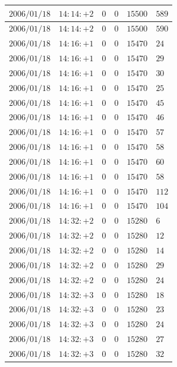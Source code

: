 \documentclass[a4j,papersize,disablejfam,slide,14pt]{jsarticle}
\begin{document}
\begin{description}
\begin{center}
\begin{longtable}{|l|l|l|l|l|l|}
					$2006/01/18$ & $14:14:+2$  & $0$ & $0$ & $15500$ & $589$ \\ \hline
					$2006/01/18$ & $14:14:+2$  & $0$ & $0$ & $15500$ & $590$ \\ \hline
					$2006/01/18$ & $14:16:+1$  & $0$ & $0$ & $15470$ & $24$ \\ \hline
					$2006/01/18$ & $14:16:+1$  & $0$ & $0$ & $15470$ & $29$ \\ \hline
					$2006/01/18$ & $14:16:+1$  & $0$ & $0$ & $15470$ & $30$ \\ \hline
					$2006/01/18$ & $14:16:+1$  & $0$ & $0$ & $15470$ & $25$ \\ \hline
					$2006/01/18$ & $14:16:+1$  & $0$ & $0$ & $15470$ & $45$ \\ \hline
					$2006/01/18$ & $14:16:+1$  & $0$ & $0$ & $15470$ & $46$ \\ \hline
					$2006/01/18$ & $14:16:+1$  & $0$ & $0$ & $15470$ & $57$ \\ \hline
					$2006/01/18$ & $14:16:+1$  & $0$ & $0$ & $15470$ & $58$ \\ \hline
					$2006/01/18$ & $14:16:+1$  & $0$ & $0$ & $15470$ & $60$ \\ \hline
					$2006/01/18$ & $14:16:+1$  & $0$ & $0$ & $15470$ & $58$ \\ \hline
					$2006/01/18$ & $14:16:+1$  & $0$ & $0$ & $15470$ & $112$ \\ \hline
					$2006/01/18$ & $14:16:+1$  & $0$ & $0$ & $15470$ & $104$ \\ \hline
					$2006/01/18$ & $14:32:+2$  & $0$ & $0$ & $15280$ & $6$ \\ \hline
					$2006/01/18$ & $14:32:+2$  & $0$ & $0$ & $15280$ & $12$ \\ \hline
					$2006/01/18$ & $14:32:+2$  & $0$ & $0$ & $15280$ & $14$ \\ \hline
					$2006/01/18$ & $14:32:+2$  & $0$ & $0$ & $15280$ & $29$ \\ \hline
					$2006/01/18$ & $14:32:+2$  & $0$ & $0$ & $15280$ & $24$ \\ \hline
					$2006/01/18$ & $14:32:+3$  & $0$ & $0$ & $15280$ & $18$ \\ \hline
					$2006/01/18$ & $14:32:+3$  & $0$ & $0$ & $15280$ & $23$ \\ \hline
					$2006/01/18$ & $14:32:+3$  & $0$ & $0$ & $15280$ & $24$ \\ \hline
					$2006/01/18$ & $14:32:+3$  & $0$ & $0$ & $15280$ & $27$ \\ \hline
					$2006/01/18$ & $14:32:+3$  & $0$ & $0$ & $15280$ & $32$ \\ \hline

\end{longtable}
\end{center}
\end{description}
\end{document}
